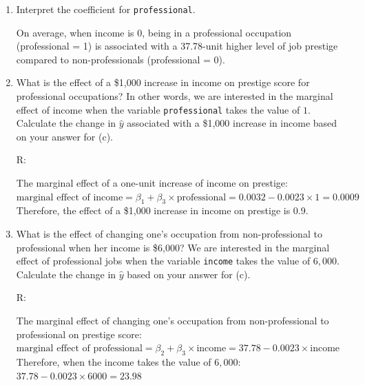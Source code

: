 \documentclass[12pt,letterpaper]{article}
\begin{document}
\begin{enumerate}
	\item [(e)]
	Interpret the coefficient for \texttt{professional}.
	
	On average, when income is 0, being in a professional occupation (professional = 1) is associated with a 37.78-unit higher level of job prestige compared to non-professionals (professional = 0).
	\vspace{1cm}
	
	\item [(f)]
	What is the effect of a \$1,000 increase in income on prestige score for professional occupations? In other words, we are interested in the marginal effect of income when the variable \texttt{professional} takes the value of $1$. Calculate the change in $\hat{y}$ associated with a \$1,000 increase in income based on your answer for (c).
	
	R:
	
	
	The marginal effect of a one-unit increase of income on prestige:\\
	
	$\text{marginal effect of income}=\beta_1+\beta_3\times\text{professional}=0.0032-0.0023\times1=0.0009$\\
	
	Therefore, the effect of a \$1,000 increase in income on prestige is 0.9.
	\vspace{1cm}
	
	
	\item [(g)]
	What is the effect of changing one's occupation from non-professional to professional when her income is \$6,000? We are interested in the marginal effect of professional jobs when the variable \texttt{income} takes the value of $6,000$. Calculate the change in $\hat{y}$ based on your answer for (c).
	
	R: 
	
	
	The marginal effect of changing one's occupation from non-professional to professional on prestige score:\\
	
	$\text{marginal effect of professional}=\beta_2+\beta_3\times\text{income}=37.78-0.0023\times\text{income}$\\
	
	Therefore, when the income takes the value of $6,000$:\\
	$37.78-0.0023\times6000=23.98$
	
\end{enumerate}
\end{document}
